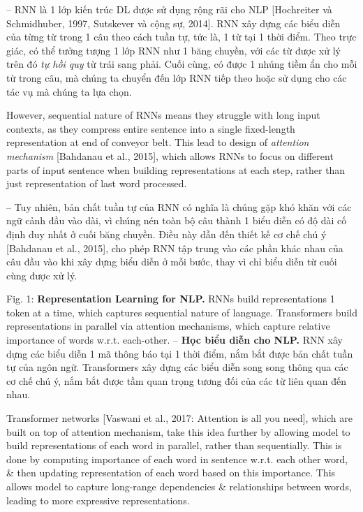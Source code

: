 \documentclass{article}
\begin{document}
\begin{itemize}
\begin{itemize}
        -- RNN là 1 lớp kiến trúc DL được sử dụng rộng rãi cho NLP [Hochreiter và Schmidhuber, 1997, Sutskever và cộng sự, 2014]. RNN xây dựng các biểu diễn của từng từ trong 1 câu theo cách tuần tự, tức là, 1 từ tại 1 thời điểm. Theo trực giác, có thể tưởng tượng 1 lớp RNN như 1 băng chuyền, với các từ được xử lý trên đó {\it tự hồi quy} từ trái sang phải. Cuối cùng, có được 1 nhúng tiềm ẩn cho mỗi từ trong câu, mà chúng ta chuyển đến lớp RNN tiếp theo hoặc sử dụng cho các tác vụ mà chúng ta lựa chọn.
        
        However, sequential nature of RNNs means they struggle with long input contexts, as they compress entire sentence into a single fixed-length representation at end of conveyor belt. This lead to design of {\it attention mechanism} [Bahdanau et al., 2015], which allows RNNs to focus on different parts of input sentence when building representations at each step, rather than just representation of last word processed.
        
        -- Tuy nhiên, bản chất tuần tự của RNN có nghĩa là chúng gặp khó khăn với các ngữ cảnh đầu vào dài, vì chúng nén toàn bộ câu thành 1 biểu diễn có độ dài cố định duy nhất ở cuối băng chuyền. Điều này dẫn đến thiết kế cơ chế chú ý [Bahdanau et al., 2015], cho phép RNN tập trung vào các phần khác nhau của câu đầu vào khi xây dựng biểu diễn ở mỗi bước, thay vì chỉ biểu diễn từ cuối cùng được xử lý.
        
        {\sf Fig. 1: {\bf Representation Learning for NLP.} RNNs build representations 1 token at a time, which captures sequential nature of language. Transformers build representations in parallel via attention mechanisms, which capture relative importance of words w.r.t. each-other.} -- {\bf Học biểu diễn cho NLP.} RNN xây dựng các biểu diễn 1 mã thông báo tại 1 thời điểm, nắm bắt được bản chất tuần tự của ngôn ngữ. Transformers xây dựng các biểu diễn song song thông qua các cơ chế chú ý, nắm bắt được tầm quan trọng tương đối của các từ liên quan đến nhau.
        
        Transformer networks [Vaswani et al., 2017: Attention is all you need], which are built on top of attention mechanism, take this idea further by allowing model to build representations of each word in parallel, rather than sequentially. This is done by computing importance of each word in sentence w.r.t. each other word, \& then updating representation of each word based on this importance. This allows model to capture long-range dependencies \& relationships between words, leading to more expressive representations.
        

\end{itemize}
\end{itemize}
\end{document}

